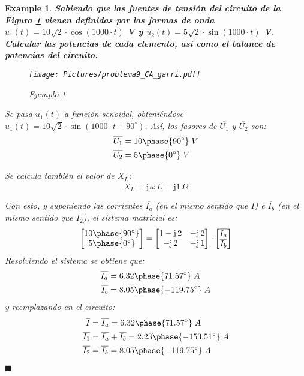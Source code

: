 \documentclass[11pt]{book} %
\numberwithin{dummy}{section}
\theoremstyle{ocrenumbox}
\theoremstyle{blacknumex}
\newtheorem{exampleT}{Example}[chapter]
\theoremstyle{blacknumbox}
\theoremstyle{ocrenum}
\newenvironment{example}{\begin{exampleT}}{\hfill{\tiny\ensuremath{\blacksquare}}\end{exampleT}}
\begin{document}
	\vspace{4mm}
	\begin{example}\label{ej.2-7}
		\textbf{Sabiendo que las fuentes de tensión del circuito de la Figura \ref{fig.problema9_garri} vienen definidas por las formas de onda $u_1(t)=10\sqrt{2}\cdot \cos(1000\cdot t)$ V y $u_2(t)=5\sqrt{2}\cdot \sin(1000\cdot t)$ V. Calcular las potencias de cada elemento, así como el balance de potencias del circuito. }
		\begin{figure}[h!]
			\centering
			\texttt{[image: Pictures/problema9\_CA\_garri.pdf]}
			\caption{Ejemplo \ref{ej.2-7}}
			\label{fig.problema9_garri}
		\end{figure}
		
		Se pasa $u_1(t)$ a función senoidal, obteniéndose $u_1(t)=10\sqrt{2}\cdot \sin(1000\cdot t+90^\circ)$. Así, los fasores de $\overline{U_1}$ y $\overline{U_2}$ son:
		\begin{align*}
			\overline{U_1}&=10\phase{90^\circ}\;V\\
			\overline{U_2}&=5\phase{0^\circ}\;V
		\end{align*}
		
		Se calcula también el valor de $\overline{X_L}$:
		\begin{equation*}
			\overline{X_L}=\mathrm{j}\,\omega\, L=\mathrm{j} 1\,\Omega
		\end{equation*}
		
		Con esto, y suponiendo las corrientes $\overline{I_a}$ (en el mismo sentido que $I$) e $\overline{I_b}$ (en el mismo sentido que $I_2$), el sistema matricial es: 
		\begin{equation*}
			\begin{bmatrix}
				10\phase{90^\circ} \\
				5\phase{0^\circ} 
			\end{bmatrix}
			=
			\begin{bmatrix}
				1-\mathrm{j}\,2 & -\mathrm{j}\,2 \\
				-\mathrm{j}\,2 & -\mathrm{j}\,1 \\
			\end{bmatrix}
			\cdot 
			\begin{bmatrix}
				\overline{I_a}\\
				\overline{I_b}
			\end{bmatrix}
		\end{equation*}
		Resolviendo el sistema se obtiene que:
		\begin{align*}
			\overline{I_a}&= 6.32\phase{71.57^\circ}\;A\\
			\overline{I_b}&= 8.05\phase{-119.75^\circ}\;A
		\end{align*}
		y reemplazando en el circuito: 
		\begin{align*}
			\overline{I}&=\overline{I_a}=6.32\phase{71.57^\circ}\;A\\
			\overline{I_1}&=\overline{I_a}+\overline{I_b}=2.23\phase{-153.51^\circ}\;A\\
			\overline{I_2}&=\overline{I_b}=8.05\phase{-119.75^\circ}\;A
		\end{align*}
		

\end{example}
\end{document}
